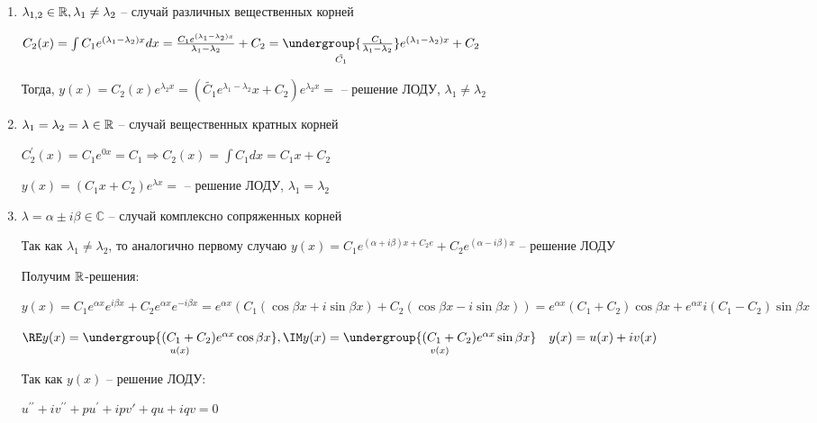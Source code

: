 \documentclass[12pt]{article}
\begin{document}
    \begin{enumerate}
        \item $\lambda_{1,2} \in \mathbb{R}, \lambda_1 \neq \lambda_2$ -- случай различных вещественных корней

        $C_2(x) = \int C_1 e^{(\lambda_1 - \lambda_2)x} dx = \frac{C_1 e^{(\lambda_1 - \lambda_2)x}}{\lambda_1 - \lambda_2} + C_2 =
        \underset{\tilde{C_1}}{\undergroup{\frac{C_1}{\lambda_1 - \lambda_2}}} e^{(\lambda_1 - \lambda_2)x} + C_2$

        Тогда, $y(x) = C_2(x) e^{\lambda_2 x} = (\tilde{C_1}e^{\lambda_1 - \lambda_2}x + C_2)e^{\lambda_2 x} = $ -- решение ЛОДУ, $\lambda_1 \neq \lambda_2$

        \hypertarget{ldesgequalrealsolutions}{}

        \item $\lambda_1 = \lambda_2 = \lambda \in \mathbb{R}$ -- случай вещественных кратных корней

        $C_2^\prime (x) = C_1 e^{0x} = C_1 \Longrightarrow C_2(x) = \int C_1 dx = C_1 x + C_2$

        $y(x) = (C_1 x + C_2)e^{\lambda x} = $ -- решение ЛОДУ, $\lambda_1 = \lambda_2$

        \hypertarget{ldesgcomplexsolutions}{}

        \item $\lambda = \alpha \pm i \beta \in \mathbb{C}$ -- случай комплексно сопряженных корней

        Так как $\lambda_1 \neq \lambda_2$, то аналогично первому случаю $y(x) = C_1 e^{(\alpha + i \beta)x + C_2 e} + C_2 e^{(\alpha - i \beta) x}$ -- решение ЛОДУ

        Получим $\mathbb{R}$-решения:

        $y(x) = C_1 e^{\alpha x} e^{i\beta x} + C_2 e^{\alpha x} e^{-i\beta x} = e^{\alpha x} (C_1 (\cos\beta x + i\sin\beta x) + C_2 (\cos\beta x - i\sin \beta x)) =
        e^{\alpha x} (C_1 + C_2) \cos\beta x + e^{\alpha x} i (C_1 - C_2) \sin\beta x$

        $\RE y(x) = \underset{u(x)}{\undergroup{(C_1 + C_2) e^{\alpha x} \cos\beta x}}, \IM y(x) = \underset{v(x)}{\undergroup{(C_1 + C_2) e^{\alpha x} \sin\beta x}} \quad y(x) = u(x) + iv(x)$

        Так как $y(x)$ -- решение ЛОДУ:

        $u^{\prime\prime} + iv^{\prime\prime} + pu^\prime + ipv\prime + qu + iqv = 0$


\end{enumerate}
\end{document}
